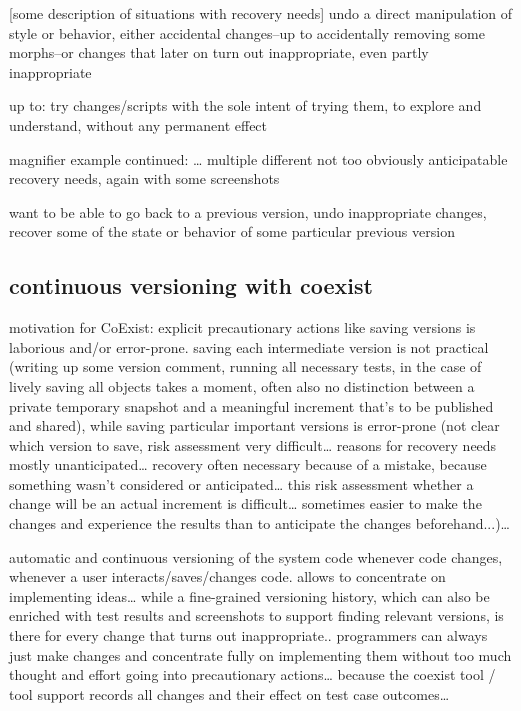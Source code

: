 [some description of situations with recovery needs]
undo a direct manipulation of style or behavior, either accidental changes–up to accidentally removing some morphs–or changes that later on turn out inappropriate, even partly inappropriate

up to: try changes/scripts with the sole intent of trying them, to explore and understand, without any permanent effect

magnifier example continued: … multiple different not too obviously anticipatable recovery needs, again with some screenshots

want to be able to go back to a previous version, undo inappropriate changes, recover some of the state or behavior of some particular previous version



\subsection{continuous versioning with coexist}

motivation for CoExist: explicit precautionary actions like saving versions is laborious and/or error-prone. saving each intermediate version is not practical (writing up some version comment, running all necessary tests, in the case of lively saving all objects takes a moment, often also no distinction between a private temporary snapshot and a meaningful increment that’s to be published and shared), while saving particular important versions is error-prone (not clear which version to save, risk assessment very difficult… reasons for recovery needs mostly unanticipated… recovery often necessary because of a mistake, because something wasn’t considered or anticipated… this risk assessment whether a change will be an actual increment is difficult… sometimes easier to make the changes and experience the results than to anticipate the changes beforehand...)… 


automatic and continuous versioning of the system code whenever code changes, whenever a user interacts/saves/changes code.
allows to concentrate on implementing ideas… while a fine-grained versioning history, which can also be enriched with test results and screenshots to support finding relevant versions, is there for every change that turns out inappropriate.. programmers can always just make changes and concentrate fully on implementing them without too much thought and effort going into precautionary actions… because the coexist tool / tool support records all changes and their effect on test case outcomes… 



